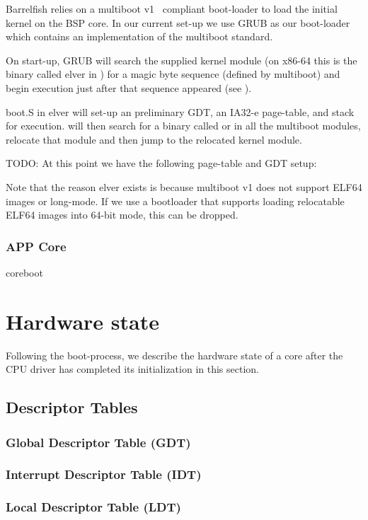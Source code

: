 \documentclass[a4paper,11pt,twoside]{report}
\begin{document}
{{Barrelfish relies on a multiboot v1~\cite{multiboot1} compliant boot-loader to
load the initial kernel on the BSP core. In our current set-up we use GRUB as
our boot-loader which contains an implementation of the multiboot standard.

On start-up, GRUB will search the supplied kernel module (on x86-64 this is the
binary called elver in ) for a magic byte sequence 
(defined by multiboot) and begin execution just after that sequence appeared
(see ).

boot.S in elver will set-up an preliminary GDT, an IA32-e page-table, and
stack for execution.  will then search for a binary called
 or  in all the multiboot modules, relocate
that module and then jump to the relocated kernel module.

TODO: At this point we have the following page-table and GDT setup:

Note that the reason elver exists is because multiboot v1 does not
support ELF64 images or long-mode. If we use a bootloader that
supports loading relocatable ELF64 images into 64-bit mode, 
this can be dropped.

\subsubsection{APP Core}
coreboot

\section{Hardware state}
Following the boot-process, we describe the hardware state of a core after the
CPU driver has completed its initialization in this section.

\subsection{Descriptor Tables}
\subsubsection{Global Descriptor Table (GDT)}
\subsubsection{Interrupt Descriptor Table (IDT)}
\subsubsection{Local Descriptor Table (LDT)}

}}
\end{document}
